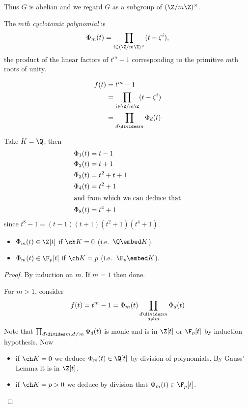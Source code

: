 \documentclass[a4paper]{article}
\begin{document}
Thus \(G\) is abelian and we regard \(G\) as a subgroup of \((\Z/m\Z)^\times\).

\begin{definition}
  The \emph{\(m\)th cyclotomic polynomial} is
  \[
    \Phi_m(t) = \prod_{i \in (\Z/m\Z)^\times} (t - \zeta^i),
  \]
  the product of the linear factors of \(t^m - 1\) corresponding to the primitive \(m\)th roots of unity.
\end{definition}

\begin{remark}
  \begin{align*}
    f(t) &= t^m - 1 \\
         &= \prod_{i \in \Z/m\Z} (t - \zeta^i) \\
         &= \prod_{d \divides m} \Phi_d(t)
  \end{align*}
\end{remark}

\begin{eg}
  Take \(K = \Q\), then
  \begin{align*}
    \Phi_1(t) &= t - 1 \\
    \Phi_2(t) &= t + 1 \\
    \Phi_3(t) &= t^2 + t + 1 \\
    \Phi_4(t) &= t^2 + 1 \\
    \intertext{and from which we can deduce that}
    \Phi_8(t) &= t^4 + 1
  \end{align*}
  since \(t^8 - 1 = (t - 1)(t + 1)(t^2 + 1)(t^4 + 1)\).
\end{eg}

\begin{lemma}\leavevmode
  \begin{itemize}
  \item \(\Phi_m(t) \in \Z[t]\) if \(\ch K = 0\) (i.e.\ \(\Q \embed K\)).
  \item \(\Phi_m(t) \in \F_p[t]\) if \(\ch K = p\) (i.e.\ \(\F_p \embed K\)).
  \end{itemize}
\end{lemma}

\begin{proof}
  By induction on \(m\). If \(m = 1\) then done.

  For \(m > 1\), consider
  \[
    f(t) = t^m - 1 =\Phi_m(t) \prod_{\substack{d \divides m \\ d \neq m}} \Phi_d(t)
  \]
  Note that \(\prod_{d \divides m, d \neq m} \Phi_d(t)\) is monic and is in \(\Z[t]\) or \(\F_p[t]\) by induction hypothesis. Now
  \begin{itemize}
  \item if \(\ch K = 0\) we deduce \(\Phi_m(t) \in \Q[t]\) by division of polynomials. By Gauss' Lemma it is in \(\Z[t]\).
  \item if \(\ch K = p > 0\) we deduce by division that \(\Phi_m(t) \in \F_p[t]\).
  \end{itemize}
\end{proof}
\end{document}
